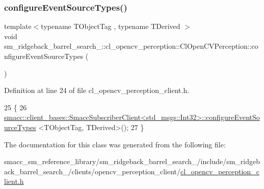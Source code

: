 \subsubsection{\texorpdfstring{configure\+Event\+Source\+Types()}{configureEventSourceTypes()}}
{\footnotesize\ttfamily template$<$typename T\+Object\+Tag , typename T\+Derived $>$ \\
void sm\+\_\+ridgeback\+\_\+barrel\+\_\+search\+\_\+::cl\+\_\+opencv\+\_\+perception\+::\+Cl\+Open\+C\+V\+Perception\+::configure\+Event\+Source\+Types (\begin{DoxyParamCaption}{ }\end{DoxyParamCaption})\hspace{0.3cm}{\ttfamily [inline]}}



Definition at line 24 of file cl\+\_\+opencv\+\_\+perception\+\_\+client.\+h.


\begin{DoxyCode}
25   \{
26     
      \hyperlink{classsmacc_1_1client__bases_1_1SmaccSubscriberClient}{smacc::client\_bases::SmaccSubscriberClient<std\_msgs::Int32>::configureEventSourceTypes}
      <TObjectTag, TDerived>();
27   \}
\end{DoxyCode}


The documentation for this class was generated from the following file\+:\begin{DoxyCompactItemize}
\item 
smacc\+\_\+sm\+\_\+reference\+\_\+library/sm\+\_\+ridgeback\+\_\+barrel\+\_\+search\+\_/include/sm\+\_\+ridgeback\+\_\+barrel\+\_\+search\+\_/clients/opencv\+\_\+perception\+\_\+client/\hyperlink{sm__ridgeback__barrel__search__1_2include_2sm__ridgeback__barrel__search__1_2clients_2opencv__peeb5457d7f99e3e3e8b4e825cafa677f7}{cl\+\_\+opencv\+\_\+perception\+\_\+client.\+h}\end{DoxyCompactItemize}
